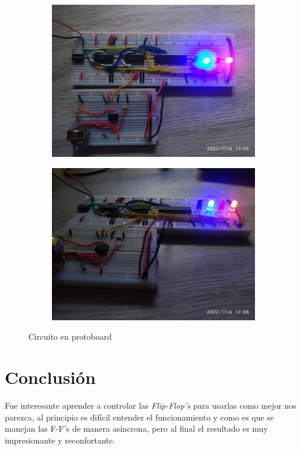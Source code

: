 \documentclass[12pt, oneside]{article}
\begin{document}
\begin{figure}[h!]
\begin{subfigure}{0.45\textwidth}
        \includegraphics[width=\linewidth]{figs/IMG_20221104_170634.jpg}
    \end{subfigure}
    \begin{subfigure}{0.45\textwidth}
        \centering
        \includegraphics[width=\linewidth]{figs/IMG_20221104_170802.jpg}
    \end{subfigure}

    \caption{\sffamily Circuito en protoboard}
    \label{fig:proto}

\end{figure}

\section{Conclusión}
{\sffamily\large
    \hspace{0.5cm} Fue interesante aprender a controlar las \emph{Flip-Flop's} para
    usarlas como mejor nos parezca, al principio es difícil entender el funcionamiento
    y como es que se manejan las F-F's de manera asíncrona, pero al final el resultado
    es muy impresionante y reconfortante.

}
\end{document}
